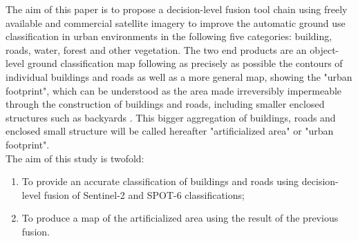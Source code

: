 \documentclass[10pt]{article}
\begin{document}
The aim of this paper is to propose a decision-level fusion tool chain using freely available and commercial satellite imagery to improve the automatic ground use classification in urban environments in the following five categories: building, roads, water, forest and other vegetation. The two end products are an object-level ground classification map following as precisely as possible the contours of individual buildings and roads as well as a more general map, showing the "urban footprint", which can be understood as the area made irreversibly impermeable through the construction of buildings and roads, including smaller enclosed structures such as backyards \parencite{puissant_object-oriented_2014}. This bigger aggregation of buildings, roads and enclosed small structure will be called hereafter "artificialized area" or "urban footprint".\\

The aim of this study is twofold:
\begin{enumerate}
    \item To provide an accurate classification of buildings and roads using decision-level fusion of Sentinel-2 and SPOT-6 classifications;
    \item To produce a map of the artificialized area using the result of the previous fusion. 
\end{enumerate}

\end{document}
